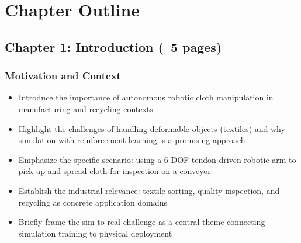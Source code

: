 \chapter{Chapter Outline}\label{ch:chapter_outline}


\section{Chapter 1: Introduction (~5 pages)}

\subsection{Motivation and Context}
\begin{itemize}
    \item Introduce the importance of autonomous robotic cloth manipulation in manufacturing and recycling contexts
    \item Highlight the challenges of handling deformable objects (textiles) and why simulation with reinforcement learning is a promising approach
    \item Emphasize the specific scenario: using a 6-DOF tendon-driven robotic arm to pick up and spread cloth for inspection on a conveyor
    \item Establish the industrial relevance: textile sorting, quality inspection, and recycling as concrete application domains
    \item Briefly frame the sim-to-real challenge as a central theme connecting simulation training to physical deployment
\end{itemize}

